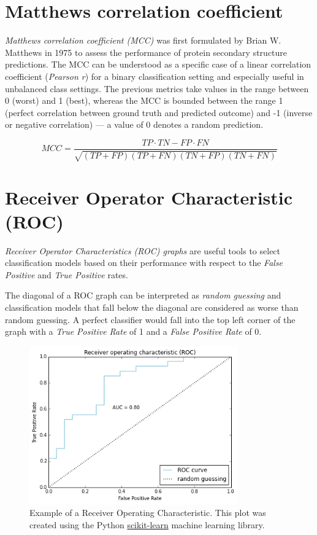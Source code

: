 \documentclass{article}
\begin{document}
\section{Matthews correlation coefficient}

\emph{Matthews correlation coefficient (MCC)} was first formulated by Brian W. Matthews \cite{matthews1975comparison} in 1975 to assess the performance of protein secondary structure predictions. The MCC can be understood as a specific case of a linear correlation coefficient (\emph{Pearson r}) for a binary classification setting and especially useful in unbalanced class settings.
The previous metrics take values in the range between 0 (worst) and 1 (best), whereas the MCC is bounded between the range 1 (perfect correlation between ground truth and predicted outcome) and -1 (inverse or negative correlation) --- a value of 0 denotes a random prediction. 

\begin{equation} MCC = \frac{ TP \cdot TN - FP \cdot FN } {\sqrt{ (TP + FP) ( TP + FN ) ( TN + FP ) ( TN + FN ) } } \end{equation}



\section{Receiver Operator Characteristic (ROC)}

\emph{Receiver Operator Characteristics (ROC) graphs} are useful tools to select classification models based on their performance with respect to the \emph{False Positive} and \emph{True Positive} rates. 


The diagonal of a ROC graph can be interpreted as \emph{random guessing} and classification models that fall below the diagonal are considered as worse than random guessing. A perfect classifier would fall into the top left corner of the graph with a \emph{True Positive Rate} of 1 and a  \emph{False Positive Rate} of 0.

\begin{figure}[h!]
    \centering
    \includegraphics[width=0.8\textwidth]{./plot/roc.png}
    \caption{Example of a Receiver Operating Characteristic. This plot was created using the Python \href{http://scikit-learn.org/stable/auto_examples/plot_roc.html}{scikit-learn} machine learning library.}

\end{figure}
\end{document}
